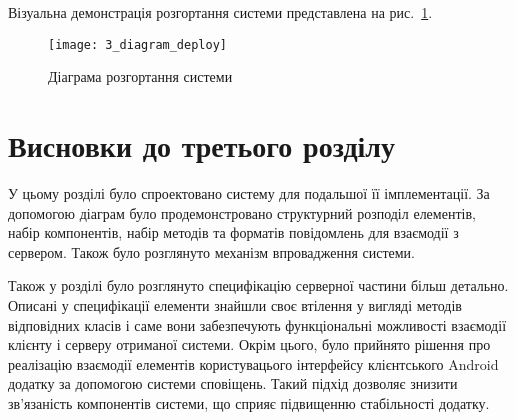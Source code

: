 \documentclass[../main.tex]{subfiles}
\begin{document}
Візуальна демонстрація розгортання системи представлена на рис.~\ref{diagram_deploy}. %

\begin{figure}[H]
	\centering
	\texttt{[image: 3\_diagram\_deploy]}
	\caption{Діаграма розгортання системи}
	\label{diagram_deploy}
\end{figure}

\section{Висновки до третього розділу}

У цьому розділі було спроектовано систему для подальшої її імплементації. За допомогою діаграм було продемонстровано структурний розподіл елементів, набір компонентів, набір методів та форматів повідомлень для взаємодії з сервером. Також було розглянуто механізм впровадження системи.

Також у розділі було розглянуто специфікацію серверної частини більш детально. Описані у специфікації елементи знайшли своє втілення у вигляді методів відповідних класів і саме вони забезпечують функціональні можливості взаємодії клієнту і серверу отриманої системи. Окрім цього, було прийнято рішення про реалізацію взаємодії елементів користувацього інтерфейсу клієнтського Android додатку за допомогою системи сповіщень. Такий підхід дозволяє знизити зв'язаність компонентів системи, що сприяє підвищенню стабільності додатку.
\end{document}
